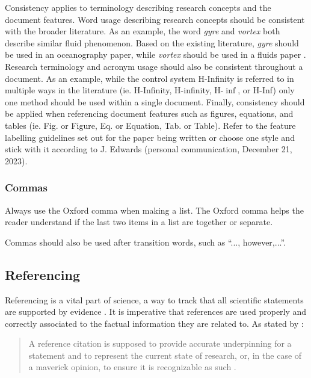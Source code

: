 Consistency applies to terminology describing research concepts and the document features. 
Word usage describing research concepts should be consistent with the broader literature. 
As an example, the word \textit{gyre} and \textit{vortex} both describe similar fluid phenomenon. Based on the existing literature, \textit{gyre} should be used in an oceanography paper, while \textit{vortex} should be used in a fluids paper \cite{Vortecies}. 
Research terminology and acronym usage should also be consistent throughout a document. As an example, while the control system H-Infinity is referred to in multiple ways in the literature (ie. H-Infinity, H-infinity, H-$\inf$, or H-Inf) only one method should be used within a single document. 
Finally, consistency should be applied when referencing document features such as figures, equations, and tables (ie. Fig. or Figure, Eq. or Equation, Tab. or Table). 
Refer to the feature labelling guidelines set out for the paper being written or choose one style and stick with it according to J. Edwards (personal communication, December 21, 2023). 

\subsubsection{Commas}

Always use the Oxford comma when making a list. The Oxford comma helps the reader understand if the last two items in a list are together or separate. 

Commas should also be used after transition words, such as ``..., however,...''. 


\subsection{Referencing}

Referencing is a vital part of science, a way to track that all scientific statements are supported by evidence \cite{referncingVirtues}. 
It is imperative that references are used properly and correctly associated to the factual information they are related to. 
As stated by \citeauthor{referncingVirtues} \cite{referncingVirtues}:
\begin{quotation}
	\noindent
	A reference citation is supposed to provide accurate underpinning for a statement and to represent the current state of research, or, in the case of a maverick opinion, to ensure it is recognizable as such \cite{referncingVirtues}.
\end{quotation} 

